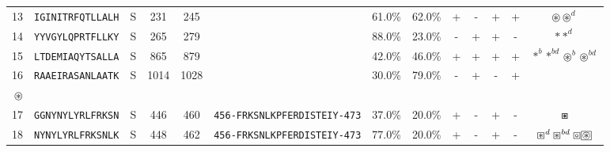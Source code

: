 \begin{tabular}{rcccccccccccc}
13 &  \texttt{IGINITRFQTLLALH} &       S &    231 &   245 &                                                                  &                          61.0\% &                           62.0\% &          + &           - &          + &           + &                                                                                                         $ \circledast \circledast^d $ \\
14 &  \texttt{YYVGYLQPRTFLLKY} &       S &    265 &   279 &                                                                  &                          88.0\% &                           23.0\% &          - &           + &          + &           - &                                                                                                                       $ \ast \ast^d $ \\
15 &  \texttt{LTDEMIAQYTSALLA} &       S &    865 &   879 &                                                                  &                          42.0\% &                           46.0\% &          + &           + &          + &           + &                                                                                   $ \ast^b \ast^{bd} \circledast^b \circledast^{bd} $ \\
16 &  \texttt{RAAEIRASANLAATK} &       S &   1014 &  1028 &                                                                  &                          30.0\% &                           79.0\% &          - &           + &          - &           + &                                                                 \Centerstack{  $\circ \circ^b \circ^d \circ^{bd}$ \\  $\circledast$ } \\
17 &  \texttt{GGNYNYLYRLFRKSN} &       S &    446 &   460 &  \texttt{{\scriptsize 456-}FRKSNLKPFERDISTEIY{\scriptsize -473}} &                          37.0\% &                           20.0\% &          + &           - &          + &           - &                                                                                                                           $ \boxast $ \\
18 &  \texttt{NYNYLYRLFRKSNLK} &       S &    448 &   462 &  \texttt{{\scriptsize 456-}FRKSNLKPFERDISTEIY{\scriptsize -473}} &                          77.0\% &                           20.0\% &          + &           - &          + &           - &                                                 $ \boxast^d \boxast^{bd} \boxcircle \setlength{\fboxsep}{0.5pt} \boxed{\circledast} $ \\

\end{tabular}
